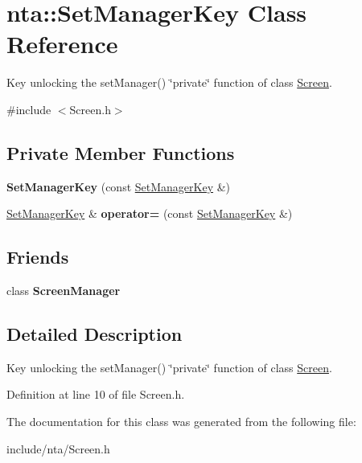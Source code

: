 \hypertarget{classnta_1_1SetManagerKey}{}\section{nta\+:\+:Set\+Manager\+Key Class Reference}
\label{classnta_1_1SetManagerKey}


Key unlocking the set\+Manager() \char`\"{}private\char`\"{} function of class \hyperlink{classnta_1_1Screen}{Screen}.  




{\ttfamily \#include $<$Screen.\+h$>$}

\subsection*{Private Member Functions}
\begin{DoxyCompactItemize}
\item 
\mbox{\label{classnta_1_1SetManagerKey_a39cf977d72e792fd57d861e46ff0de5a}} 
{\bfseries Set\+Manager\+Key} (const \hyperlink{classnta_1_1SetManagerKey}{Set\+Manager\+Key} \&)
\item 
\mbox{\label{classnta_1_1SetManagerKey_a2827a71fc493a6c61697c42dc999389e}} 
\hyperlink{classnta_1_1SetManagerKey}{Set\+Manager\+Key} \& {\bfseries operator=} (const \hyperlink{classnta_1_1SetManagerKey}{Set\+Manager\+Key} \&)
\end{DoxyCompactItemize}
\subsection*{Friends}
\begin{DoxyCompactItemize}
\item 
\mbox{\label{classnta_1_1SetManagerKey_a888edc649fed896d28811ec69f3f2066}} 
class {\bfseries Screen\+Manager}
\end{DoxyCompactItemize}


\subsection{Detailed Description}
Key unlocking the set\+Manager() \char`\"{}private\char`\"{} function of class \hyperlink{classnta_1_1Screen}{Screen}. 

Definition at line 10 of file Screen.\+h.



The documentation for this class was generated from the following file\+:\begin{DoxyCompactItemize}
\item 
include/nta/Screen.\+h\end{DoxyCompactItemize}
